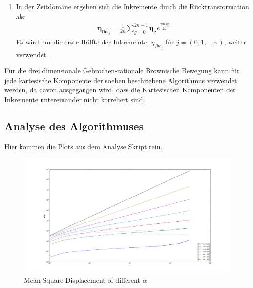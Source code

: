 \documentclass[
  a4paper,BCOR10mm,oneside,
  bibtotoc,idxtotoc,
  headsepline,footsepline,%
  fleqn,openbib
]{scrbook}
\begin{document}
\begin{enumerate}
 \item In der Zeitdomäne ergeben sich die Inkremente durch die Rücktransformation als:
 \begin{align}
 \boldsymbol{\eta_{fbr_j}}= \frac{1}{2n} \sum_{g=0}^{2n-1} \boldsymbol{\eta_g} e^{\frac{2 \pi i j g }{2n}}
 \end{align}
Es wird nur die erste Hälfte der Inkremente, $\eta_{fbr_j}$ für $j=(0,1,..,n)$, weiter verwendet.
\end{enumerate}
Für die drei dimensionale Gebrochen-rationale Brownische Bewegung kann für jede kartesische Komponente der soeben beschriebene Algorithmus verwendet werden, da davon ausgegangen wird, dass die Kartesischen Komponenten der Inkremente untereinander nicht korreliert sind. 
\subsection{Analyse des Algorithmuses}
Hier kommen die Plots  aus dem Analyse Skript rein.

\begin{figure}[h]
\includegraphics[width=\textwidth]{./msd_ensemble_alpha.pdf}
\caption{Mean Square Displacement of different $\alpha$}
 \centering
\end{figure}
\end{document}
